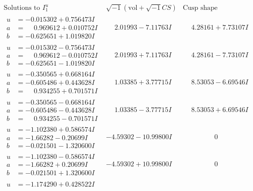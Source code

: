 \documentclass[1p]{elsarticle_modified}
\theoremstyle{definition}
\newcommand{\I}{\sqrt{-1}}
\begin{document}
$$\begin{array}{c|c|c}
\text{Solutions to }I^u_{1}& \I (\text{vol} + \sqrt{-1}CS) & \text{Cusp shape}\\
 \hline 
\begin{aligned}
u &= -0.015302 + 0.756473 I \\
a &= \phantom{-}0.969612 + 0.010752 I \\
b &= -0.625651 + 1.019820 I\end{aligned}
 & \phantom{-}2.01993 - 7.11763 I & \phantom{-}4.28161 + 7.73107 I \\ \hline\begin{aligned}
u &= -0.015302 - 0.756473 I \\
a &= \phantom{-}0.969612 - 0.010752 I \\
b &= -0.625651 - 1.019820 I\end{aligned}
 & \phantom{-}2.01993 + 7.11763 I & \phantom{-}4.28161 - 7.73107 I \\ \hline\begin{aligned}
u &= -0.350565 + 0.668164 I \\
a &= -0.605486 + 0.443628 I \\
b &= \phantom{-}0.934255 + 0.701571 I\end{aligned}
 & \phantom{-}1.03385 + 3.77715 I & \phantom{-}8.53053 - 6.69546 I \\ \hline\begin{aligned}
u &= -0.350565 - 0.668164 I \\
a &= -0.605486 - 0.443628 I \\
b &= \phantom{-}0.934255 - 0.701571 I\end{aligned}
 & \phantom{-}1.03385 - 3.77715 I & \phantom{-}8.53053 + 6.69546 I \\ \hline\begin{aligned}
u &= -1.102380 + 0.586574 I \\
a &= -1.66282 - 0.20699 I \\
b &= -0.021501 - 1.320600 I\end{aligned}
 & -4.59302 - 10.99800 I & \phantom{-0.000000 } 0 \\ \hline\begin{aligned}
u &= -1.102380 - 0.586574 I \\
a &= -1.66282 + 0.20699 I \\
b &= -0.021501 + 1.320600 I\end{aligned}
 & -4.59302 + 10.99800 I & \phantom{-0.000000 } 0 \\ \hline\begin{aligned}
u &= -1.174290 + 0.428522 I \\

\end{aligned}
\end{array}$$
\end{document}

